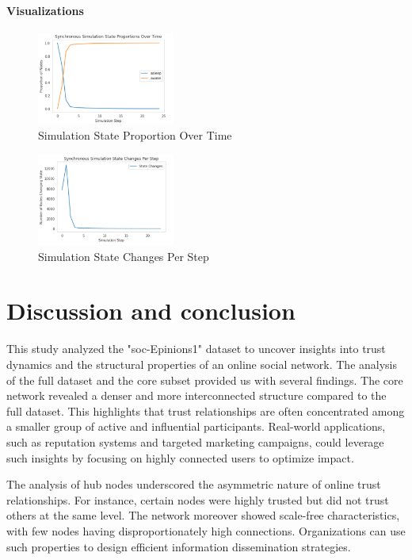 \documentclass[conference]{IEEEtran}
\begin{document}
\paragraph{Visualizations}
\begin{figure}[H]
    \centerline{\includegraphics[width=0.4\textwidth]{img/simulation_proportions.png}}
    \centering
    \caption{Simulation State Proportion Over Time}
    \label{fig:sim_prop}
\end{figure}
\begin{figure}[H]
    \centerline{\includegraphics[width=0.4\textwidth]{img/simulation_changes.png}}
    \centering
    \caption{Simulation State Changes Per Step}
    \label{fig:sim_changes}
\end{figure}

\section{Discussion and conclusion}
This study analyzed the "soc-Epinions1" dataset to uncover insights into trust dynamics and the structural properties of an online social network. The analysis of the full dataset and the core subset provided us with several findings. The core network revealed a denser and more interconnected structure compared to the full dataset. This highlights that trust relationships are often concentrated among a smaller group of active and influential participants. Real-world applications, such as reputation systems and targeted marketing campaigns, could leverage such insights by focusing on highly connected users to optimize impact. 

The analysis of hub nodes underscored the asymmetric nature of online trust relationships. For instance, certain nodes were highly trusted but did not trust others at the same level. The network moreover showed scale-free characteristics, with few nodes having disproportionately high connections. Organizations can use such properties to design efficient information dissemination strategies.
\end{document}
